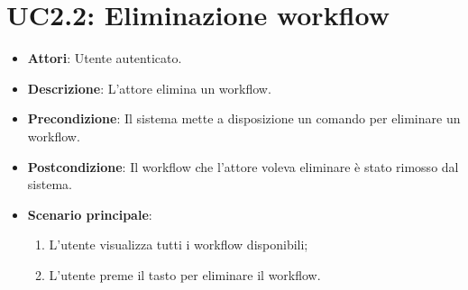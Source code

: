 \section{UC2.2: Eliminazione workflow}
\label{UC2.2}
\begin{itemize}
	\item \textbf{Attori}: Utente autenticato.
	\item \textbf{Descrizione}: L'attore elimina un workflow.
	\item \textbf{Precondizione}: Il sistema mette a disposizione un comando per eliminare un workflow.
	\item \textbf{Postcondizione}: Il workflow che l'attore voleva eliminare è stato rimosso dal sistema.
	\item \textbf{Scenario principale}:
	\begin{enumerate} \item L'utente visualizza tutti i workflow disponibili; \item L'utente preme il tasto per eliminare il workflow.\end{enumerate}
\end{itemize}

